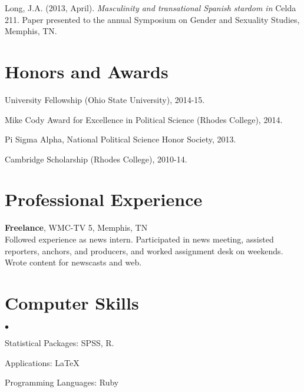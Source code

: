 \documentclass[margin,line]{res}
\newenvironment{list2}{
  \begin{list}{$\bullet$}{%
      \setlength{\itemsep}{0in}
      \setlength{\parsep}{0in} \setlength{\parskip}{0in}
      \setlength{\topsep}{0in} \setlength{\partopsep}{0in} 
      \setlength{\leftmargin}{0.2in}}}{\end{list}}
\begin{document}
\begin{resume}
Long, J.A. (2013, April). \emph{Masculinity and transational Spanish stardom in} Celda 211. Paper presented to the annual Symposium on Gender and Sexuality Studies, Memphis, TN.

\section{\sc Honors and Awards} 
University Fellowship (Ohio State University), 2014-15.

\vspace*{-2.5mm}
Mike Cody Award for Excellence in Political Science (Rhodes College), 2014.

\vspace*{-2.5mm}
Pi Sigma Alpha, National Political Science Honor Society, 2013.

\vspace*{-2.5mm}
Cambridge Scholarship (Rhodes College), 2010-14.

\section{\sc Professional Experience}
{\bf Freelance}, WMC-TV 5, Memphis, TN\\
Followed experience as news intern. Participated in news meeting, assisted reporters, anchors, and producers, and worked assignment desk on weekends. Wrote content for newscasts and web.



\section{\sc Computer Skills} 
\begin{list2}
\item Statistical Packages:  SPSS, R.
\item Applications: \LaTeX
\item Programming Languages: Ruby\\ 
\end{list2}



\end{resume}
\end{document}
